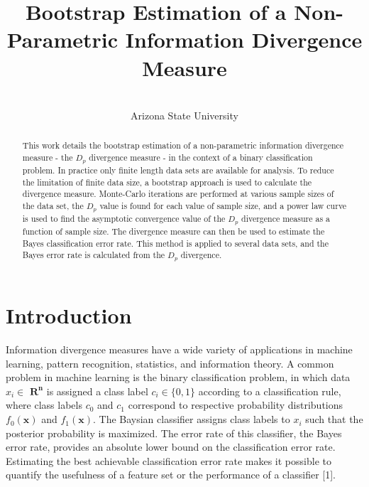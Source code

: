 \documentclass{article}
\begin{document}
	\title{Bootstrap Estimation of a Non-Parametric Information Divergence Measure}
	\author { \\
		\small Arizona State University}
	\date{}
	\maketitle

	\begin{abstract}
		
		This work details the bootstrap estimation of a non-parametric information divergence measure - the $D_p$ divergence measure - in the context of a binary classification problem. In practice only finite length data sets are available for analysis. To reduce the limitation of finite data size, a bootstrap approach is used to calculate the divergence measure. Monte-Carlo iterations are performed at various sample sizes of the data set, the $D_p$ value is found for each value of sample size, and a power law curve is used to find the asymptotic convergence value of the $D_p$ divergence measure as a function of sample size. The divergence measure can then be used to estimate the Bayes classification error rate. This method is applied to several data sets, and the Bayes error rate is calculated from the $D_p$ divergence.
	\end{abstract}

		\section{Introduction}
		\indent Information divergence measures have a wide variety of applications in machine learning, pattern recognition, statistics, and information theory. A common problem in machine learning is the binary classification problem, in which data $x_i\in$ $\mathbf{R^n}$ is assigned a class label $c_i \in \{0,1\}$ according to a classification rule, where class labels $c_0$ and $c_1$ correspond to respective probability distributions $f_0(\textbf{x})$ and $f_1(\textbf{x})$. The Baysian classifier assigns class labels to $x_i$ such that the posterior probability is maximized. The error rate of this classifier, the Bayes error rate, provides an absolute lower bound on the classification error rate.  Estimating the best achievable classification error rate makes it possible to quantify the usefulness of a feature set or the performance of a classifier [1]. 
		
\end{document}
